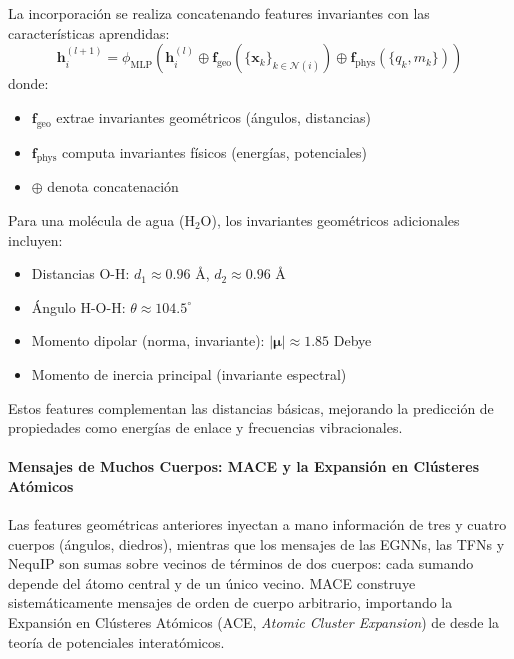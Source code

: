 La incorporación se realiza concatenando features invariantes con las características aprendidas:
\begin{equation}
\mathbf{h}_i^{(l+1)} = \phi_{\text{MLP}}\left(\mathbf{h}_i^{(l)} \oplus \mathbf{f}_{\text{geo}}(\{\mathbf{x}_k\}_{k \in \mathcal{N}(i)}) \oplus \mathbf{f}_{\text{phys}}(\{q_k, m_k\})\right)
\end{equation}
donde:
\begin{itemize}
    \item $\mathbf{f}_{\text{geo}}$ extrae invariantes geométricos (ángulos, distancias)
    \item $\mathbf{f}_{\text{phys}}$ computa invariantes físicos (energías, potenciales)
    \item $\oplus$ denota concatenación
\end{itemize}

\begin{example}
Para una molécula de agua (H$_2$O), los invariantes geométricos adicionales incluyen:
\begin{itemize}
    \item Distancias O-H: $d_1 \approx 0.96$ Å, $d_2 \approx 0.96$ Å
    \item Ángulo H-O-H: $\theta \approx 104.5^\circ$
    \item Momento dipolar (norma, invariante): $|\boldsymbol{\mu}| \approx 1.85$ Debye
    \item Momento de inercia principal (invariante espectral)
\end{itemize}

Estos features complementan las distancias básicas, mejorando la predicción de propiedades como energías de enlace y frecuencias vibracionales.
\end{example}

\paragraph{Mensajes de Muchos Cuerpos: MACE y la Expansión en Clústeres Atómicos}

Las features geométricas anteriores inyectan a mano información de tres y cuatro cuerpos (ángulos, diedros), mientras que los mensajes de las EGNNs, las TFNs y NequIP son sumas sobre vecinos de términos de dos cuerpos: cada sumando depende del átomo central y de un único vecino. MACE \citep{batatia2022mace} construye sistemáticamente mensajes de orden de cuerpo arbitrario, importando la Expansión en Clústeres Atómicos (ACE, \textit{Atomic Cluster Expansion}) de \citet{drautz2019atomic} desde la teoría de potenciales interatómicos.

